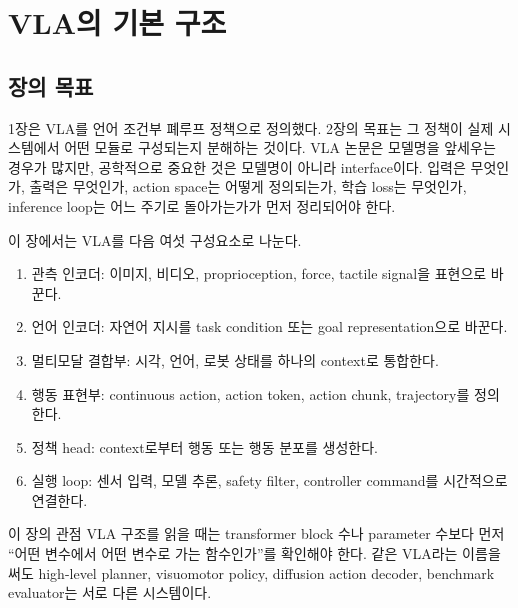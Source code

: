 \chapter{VLA의 기본 구조}

\section{장의 목표}

1장은 VLA를 언어 조건부 폐루프 정책으로 정의했다. 2장의 목표는 그 정책이 실제 시스템에서 어떤 모듈로 구성되는지 분해하는 것이다. VLA 논문은 모델명을 앞세우는 경우가 많지만, 공학적으로 중요한 것은 모델명이 아니라 interface이다. 입력은 무엇인가, 출력은 무엇인가, action space는 어떻게 정의되는가, 학습 loss는 무엇인가, inference loop는 어느 주기로 돌아가는가가 먼저 정리되어야 한다.

이 장에서는 VLA를 다음 여섯 구성요소로 나눈다.

\begin{enumerate}
  \item 관측 인코더: 이미지, 비디오, proprioception, force, tactile signal을 표현으로 바꾼다.
  \item 언어 인코더: 자연어 지시를 task condition 또는 goal representation으로 바꾼다.
  \item 멀티모달 결합부: 시각, 언어, 로봇 상태를 하나의 context로 통합한다.
  \item 행동 표현부: continuous action, action token, action chunk, trajectory를 정의한다.
  \item 정책 head: context로부터 행동 또는 행동 분포를 생성한다.
  \item 실행 loop: 센서 입력, 모델 추론, safety filter, controller command를 시간적으로 연결한다.
\end{enumerate}

\begin{conceptbox}{이 장의 관점}
VLA 구조를 읽을 때는 transformer block 수나 parameter 수보다 먼저 ``어떤 변수에서 어떤 변수로 가는 함수인가''를 확인해야 한다. 같은 VLA라는 이름을 써도 high-level planner, visuomotor policy, diffusion action decoder, benchmark evaluator는 서로 다른 시스템이다.
\end{conceptbox}

